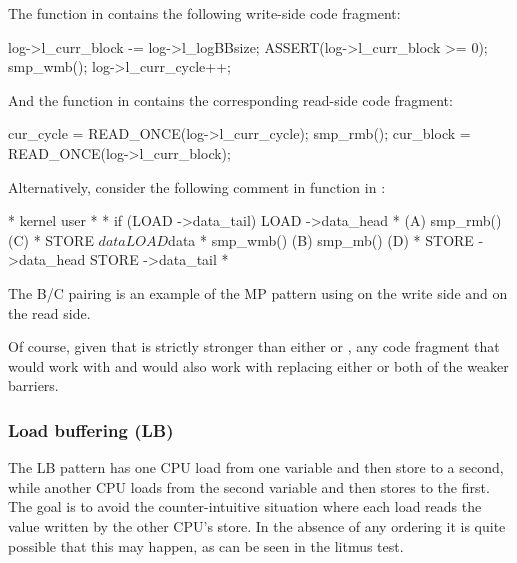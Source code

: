 The  function in 
contains the following write-side code fragment:

\begin{VerbatimU}
	log->l_curr_block -= log->l_logBBsize;
	ASSERT(log->l_curr_block >= 0);
	smp_wmb();
	log->l_curr_cycle++;
\end{VerbatimU}

And the  function in 
contains the corresponding read-side code fragment:

\begin{VerbatimU}
	cur_cycle = READ_ONCE(log->l_curr_cycle);
	smp_rmb();
	cur_block = READ_ONCE(log->l_curr_block);
\end{VerbatimU}

Alternatively, consider the following comment in function
 in :

\begin{VerbatimU}
	 *   kernel                             user
	 *
	 *   if (LOAD ->data_tail) {            LOAD ->data_head
	 *                      (A)             smp_rmb()       (C)
	 *      STORE $data                     LOAD $data
	 *      smp_wmb()       (B)             smp_mb()        (D)
	 *      STORE ->data_head               STORE ->data_tail
	 *   }
\end{VerbatimU}

The B/C pairing is an example of the MP pattern using  on the
write side and  on the read side.

Of course, given that  is strictly stronger than either
 or , any code fragment that would work with
 and  would also work with 
replacing either or both of the weaker barriers.


\subsubsection{Load buffering (LB)}

The LB pattern has one CPU load from one variable and then store to a
second, while another CPU loads from the second variable and then stores
to the first.
The goal is to avoid the counter-intuitive situation where each load
reads the value written by the other CPU's store.
In the absence of any ordering it is quite possible that this may happen,
as can be seen in the  litmus test.

